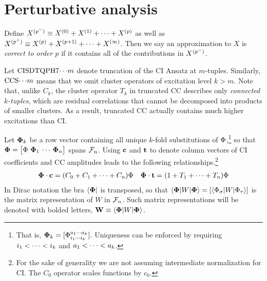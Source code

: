 \documentclass[11pt]{article}
\numberwithin{equation}{section}
\begin{document}
\setlength{\abovedisplayskip}{3pt}
\setlength{\belowdisplayskip}{3pt}



\setcounter{section}{6}
\section{Perturbative analysis}


\begin{dfn}
Define $X^{(p^-)}\equiv X^{(0)}+X^{(1)}+\cdots+X^{(p)}$
as well as
$
  X^{(p^+)}
\equiv
  X^{(p)}
+
  X^{(p+1)}
+
  \cdots
+
  X^{(\infty)}
$.
Then we say an approximation to $X$ is \textit{correct to order $p$} if it contains all of the contributions in $X^{(p^-)}$.
\end{dfn}

\begin{dfn}
Let $\mathrm{CISDTQPH7}{\cdots}m$ denote truncation of the CI Ansatz at $m$-tuples.
Similarly, $\mathrm{CCS}{\cdots}m$ means that we omit cluster operators of excitation level $k>m$.
Note that, unlike $C_k$, the cluster operator $T_k$ in truncated CC describes only \textit{connected $k$-tuples}, which are residual correlations that cannot be decomposed into products of smaller clusters.
As a result, truncated CC actually contains much higher excitations than CI.
\end{dfn}

\begin{ntt}
Let
$\bm{\F}_k$
be a row vector containing all unique $k$-fold substitutions of $\Phi $,\footnote{That is, $\bm{\F}_k=[\F_{i_1\cd i_k}^{a_1\cd a_k}]$.
Uniqueness can be enforced by requiring $i_1<\cdots<i_k$ and $a_1<\cdots<a_k$.}
so that $\bm{\F}=\pma{\F\ \bm{\F}_1\,\cd\,\bm{\F}_n}$ spans $\mathcal{F}_n$.
Using $\mathbf{c}$ and $\mathbf{t}$ to denote column vectors of CI coefficients and CC amplitudes leads to the following relationships.\footnote{For the sake of generality we are not assuming intermediate normalization for CI.  The $C_0$ operator scales functions by $c_0$.}
\begin{align}
  \mathbf{\Phi }\cdot\mathbf{c}
=
  (C_0 + C_1+\cdots +C_n)\Phi 
&&
  \mathbf{\Phi }\cdot\mathbf{t}
=
  (1 + T_1+\cdots +T_n)\Phi 
\end{align}
In Dirac notation the bra $\langle\mathbf{\Phi }|$ is transposed, so that
$
  \ip{\bm{\F}|W|\bm{\F}}
=
  [\ip{\F_\si|W|\F_\ta}]
$
is the matrix representation of $W$ in $\mathcal{F}_n$.
Such matrix representations will be denoted with bolded letters,
$
  \bo{W}
\equiv
  \ip{\bm{\F}|W|\bm{\F}}
$.
\end{ntt}
\end{document}
